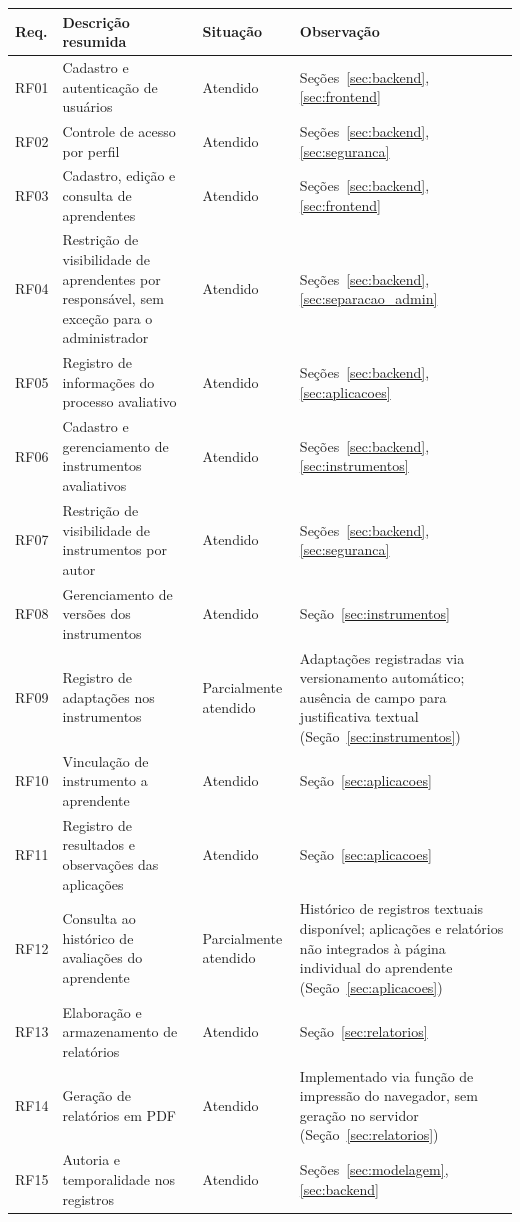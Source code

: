 \begin{quadro}[H]
\centering
\footnotesize
\caption{Atendimento aos requisitos funcionais}
\begin{tabular}{|p{1.1cm}|p{6.2cm}|p{1.8cm}|p{4.8cm}|}
\hline
\textbf{Req.} & \textbf{Descrição resumida} & \textbf{Situação} & \textbf{Observação} \\
\hline
RF01 & Cadastro e autenticação de usuários & Atendido & Seções~\ref{sec:backend}, \ref{sec:frontend} \\ \hline
RF02 & Controle de acesso por perfil & Atendido & Seções~\ref{sec:backend}, \ref{sec:seguranca} \\ \hline
RF03 & Cadastro, edição e consulta de aprendentes & Atendido & Seções~\ref{sec:backend}, \ref{sec:frontend} \\ \hline
RF04 & Restrição de visibilidade de aprendentes por responsável, sem exceção para o administrador & Atendido & Seções~\ref{sec:backend}, \ref{sec:separacao_admin} \\ \hline
RF05 & Registro de informações do processo avaliativo & Atendido & Seções~\ref{sec:backend}, \ref{sec:aplicacoes} \\ \hline
RF06 & Cadastro e gerenciamento de instrumentos avaliativos & Atendido & Seções~\ref{sec:backend}, \ref{sec:instrumentos} \\ \hline
RF07 & Restrição de visibilidade de instrumentos por autor & Atendido & Seções~\ref{sec:backend}, \ref{sec:seguranca} \\ \hline
RF08 & Gerenciamento de versões dos instrumentos & Atendido & Seção~\ref{sec:instrumentos} \\ \hline
RF09 & Registro de adaptações nos instrumentos & Parcial\-mente atendido & Adaptações registradas via versionamento automático; ausência de campo para justificativa textual (Seção~\ref{sec:instrumentos}) \\ \hline
RF10 & Vinculação de instrumento a aprendente & Atendido & Seção~\ref{sec:aplicacoes} \\ \hline
RF11 & Registro de resultados e observações das aplicações & Atendido & Seção~\ref{sec:aplicacoes} \\ \hline
RF12 & Consulta ao histórico de avaliações do aprendente & Parcial\-mente atendido & Histórico de registros textuais disponível; aplicações e relatórios não integrados à página individual do aprendente (Seção~\ref{sec:aplicacoes}) \\ \hline
RF13 & Elaboração e armazenamento de relatórios & Atendido & Seção~\ref{sec:relatorios} \\ \hline
RF14 & Geração de relatórios em PDF & Atendido & Implementado via função de impressão do navegador, sem geração no servidor (Seção~\ref{sec:relatorios}) \\ \hline
RF15 & Autoria e temporalidade nos registros & Atendido & Seções~\ref{sec:modelagem}, \ref{sec:backend} \\ \hline
\end{tabular}
\label{qua:atendimento_requisitos_funcionais}
\end{quadro}

